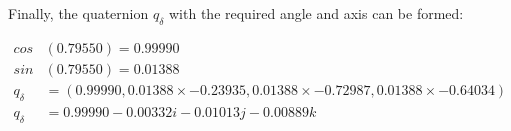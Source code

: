 \documentclass{article}
\begin{document}
Finally, the quaternion $q_{\delta}$ with the required angle and axis can be formed:

\begin{align*}
cos&(0.79550) = 0.99990\\[1em]
sin&(0.79550) = 0.01388\\[1em]
q_{\delta} &= (0.99990, 0.01388 \times - 0.23935, 0.01388 \times - 0.72987, 0.01388 \times - 0.64034)\\[1em]
q_{\delta} &= 0.99990 - 0.00332i - 0.01013j - 0.00889k\\
\end{align*}
\end{document}
